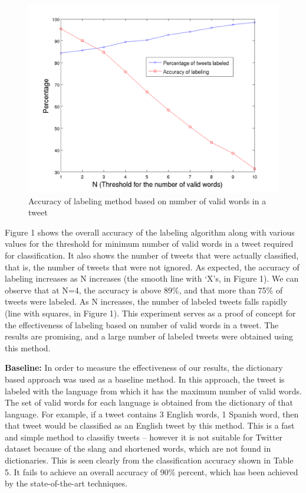 \documentclass[11pt]{article}
\begin{document}
\begin{figure}[ht]
\includegraphics[scale=0.4]{accuracy_words.png}
\caption{\footnotesize Accuracy of labeling method based on number of valid words in a tweet}
\label{fig:s2}
\end{figure}


Figure 1 shows the overall accuracy of the labeling algorithm along with various values for the threshold for minimum number of valid words in a tweet required for classification. It also shows the number of tweets that were actually classified, that is, the number of tweets that were not ignored. As expected, the accuracy of labeling increases as N increases (the smooth line with `X's, in Figure 1). We can observe that at N=4, the accuracy is above 89\%, and that more than 75\% of tweets were labeled. As N increases, the number of labeled tweets falls rapidly (line with squares, in Figure 1). This experiment serves as a proof of concept for the effectiveness of labeling based on number of valid words in a tweet. The results are promising, and a large number of labeled tweets were obtained using this method.

{\textbf {Baseline: }}  In order to measure the effectiveness of our results, the dictionary based approach was used as a baseline method. In this approach, the tweet is labeled with the language from which it has the maximum number of valid words. The set of valid words for each language is obtained from the dictionary of that language. For example, if a tweet contains 3 English words, 1 Spanish word, then that tweet would be classified as an English tweet by this method. This is a fast and simple method to classifiy tweets -- however it is not suitable for Twitter dataset because of the slang and shortened words, which are not found in dictionaries. This is seen clearly from the classification accuracy shown in Table 5. It fails to achieve an overall accuracy of 90\% percent, which has been achieved by the state-of-the-art techniques.
\end{document}
